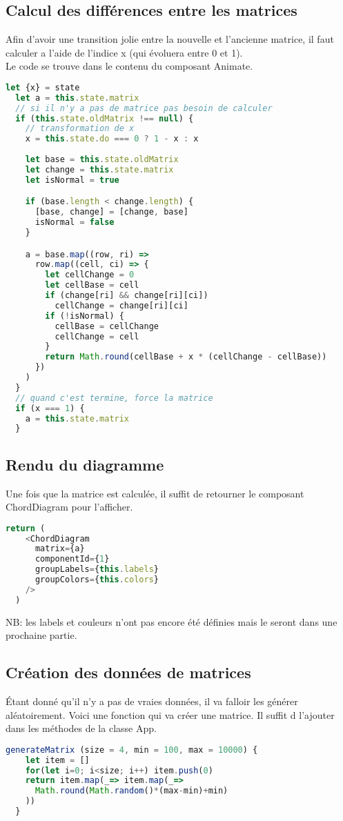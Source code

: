 \documentclass[a4paper, french, 12pt]{extarticle}
\begin{document}
\subsection{Calcul des différences entre les matrices}
Afin d'avoir une transition jolie entre la nouvelle et l'ancienne matrice, il faut calculer a l'aide de l'indice x (qui évoluera entre 0 et 1).\\
Le code se trouve dans le contenu du composant Animate. 
\begin{lstlisting}[language=JavaScript]
  let {x} = state
  let a = this.state.matrix
  // si il n'y a pas de matrice pas besoin de calculer
  if (this.state.oldMatrix !== null) {
    // transformation de x
    x = this.state.do === 0 ? 1 - x : x
    
    let base = this.state.oldMatrix
    let change = this.state.matrix
    let isNormal = true

    if (base.length < change.length) {
      [base, change] = [change, base]
      isNormal = false
    }

    a = base.map((row, ri) =>
      row.map((cell, ci) => {
        let cellChange = 0
        let cellBase = cell
        if (change[ri] && change[ri][ci])
          cellChange = change[ri][ci]
        if (!isNormal) {
          cellBase = cellChange
          cellChange = cell
        }
        return Math.round(cellBase + x * (cellChange - cellBase))
      })
    )
  }
  // quand c'est termine, force la matrice
  if (x === 1) {
    a = this.state.matrix
  }
\end{lstlisting}

\subsection{Rendu du diagramme}
Une fois que la matrice est calculée, il suffit de retourner le composant ChordDiagram pour l'afficher.
\begin{lstlisting}[language=JavaScript]
  return (
    <ChordDiagram
      matrix={a}
      componentId={1}
      groupLabels={this.labels}
      groupColors={this.colors}
    />
  )
\end{lstlisting}
NB: les labels et couleurs n'ont pas encore été définies mais le seront dans une prochaine partie.

\subsection{Création des données de matrices}
Étant donné qu'il n'y a pas de vraies données, il va falloir les générer aléatoirement. Voici une fonction qui va créer une matrice. Il suffit d l'ajouter dans les méthodes de la classe App.
\begin{lstlisting}[language=JavaScript]
  generateMatrix (size = 4, min = 100, max = 10000) {
    let item = []
    for(let i=0; i<size; i++) item.push(0)
    return item.map(_=> item.map(_=>
      Math.round(Math.random()*(max-min)+min)
    ))
  }
\end{lstlisting}
\end{document}
